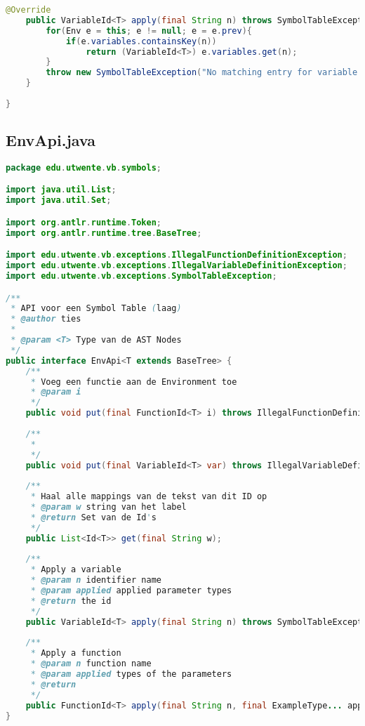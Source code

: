 \begin{lstlisting}[language=Java]
	@Override
	public VariableId<T> apply(final String n) throws SymbolTableException {
		for(Env e = this; e != null; e = e.prev){
			if(e.variables.containsKey(n))
				return (VariableId<T>) e.variables.get(n);
		}
		throw new SymbolTableException("No matching entry for variable name " + n);
	}
	
}
\end{lstlisting}
\subsection{EnvApi.java}
\begin{lstlisting}[language=Java]
package edu.utwente.vb.symbols;

import java.util.List;
import java.util.Set;

import org.antlr.runtime.Token;
import org.antlr.runtime.tree.BaseTree;

import edu.utwente.vb.exceptions.IllegalFunctionDefinitionException;
import edu.utwente.vb.exceptions.IllegalVariableDefinitionException;
import edu.utwente.vb.exceptions.SymbolTableException;

/**
 * API voor een Symbol Table (laag)
 * @author ties
 *
 * @param <T> Type van de AST Nodes
 */
public interface EnvApi<T extends BaseTree> {
	/**
	 * Voeg een functie aan de Environment toe
	 * @param i
	 */
	public void put(final FunctionId<T> i) throws IllegalFunctionDefinitionException;
	
	/**
	 * 
	 */
	public void put(final VariableId<T> var) throws IllegalVariableDefinitionException;
	
	/**
	 * Haal alle mappings van de tekst van dit ID op
	 * @param w string van het label
	 * @return Set van de Id's
	 */
	public List<Id<T>> get(final String w);
	
	/**
	 * Apply a variable
	 * @param n identifier name
	 * @param applied applied parameter types
	 * @return the id
	 */
	public VariableId<T> apply(final String n) throws SymbolTableException;
	
	/**
	 * Apply a function
	 * @param n function name
	 * @param applied types of the parameters
	 * @return
	 */
	public FunctionId<T> apply(final String n, final ExampleType... applied) throws SymbolTableException;
}
\end{lstlisting}
